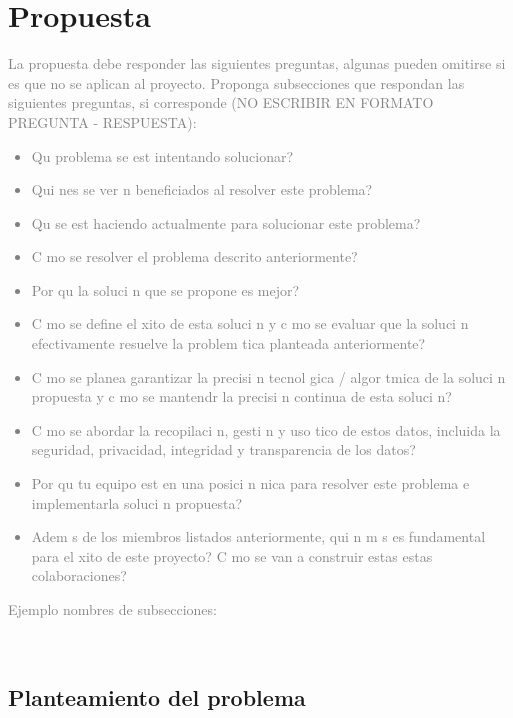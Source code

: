 \documentclass{article}
\begin{document}
\section{Propuesta} 
\noindent \textcolor{gray}{La propuesta debe responder las siguientes preguntas, algunas pueden omitirse si es que no se aplican al proyecto. Proponga subsecciones que respondan las siguientes preguntas, si  corresponde  (NO ESCRIBIR EN FORMATO PREGUNTA - RESPUESTA):  
\begin{itemize}
\item  Qu   problema  se  est   intentando  solucionar?
\item  Qui nes  se  ver n  beneficiados  al  resolver  este problema?
\item Qu   se  est   haciendo  actualmente  para  solucionar  este  problema?
\item  C mo  se  resolver   el  problema  descrito  anteriormente?
\item  Por  qu   la  soluci n que  se propone  es  mejor?
\item  C mo  se  define  el   xito  de  esta  soluci n  y  c mo  se  evaluar   que  la  soluci n  efectivamente resuelve  la  problem tica  planteada  anteriormente?
\item  C mo  se  planea  garantizar  la  precisi n  tecnol gica  /  algor tmica  de  la  soluci n  propuesta  
y c mo  se  mantendr   la  precisi n  continua  de  esta  soluci n?
\item  C mo  se  abordar   la  recopilaci n,  gesti n  y  uso   tico  de  estos  datos,  incluida  la  
seguridad, privacidad,  integridad  y  transparencia  de  los  datos?
\item  Por  qu   tu  equipo  est   en  una  posici n   nica  para  resolver  este  problema  e  implementarla soluci n  propuesta?
\item  Adem s  de  los  miembros  listados  anteriormente,  qui n  m s  es  fundamental  para  el   xito
de  este proyecto?  C mo  se  van  a  construir  estas  estas  colaboraciones?
\end{itemize}}
\newpage


\thispagestyle{empty}

\noindent\textcolor{gray}{Ejemplo nombres de subsecciones:}

\



\subsection*{Planteamiento del problema}
\end{document}
